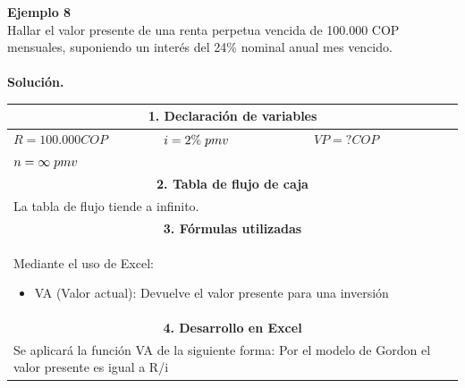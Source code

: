 \textbf{Ejemplo 8}\\
Hallar el valor presente de una renta perpetua vencida de 100.000 COP mensuales, suponiendo un interés
del 24\% nominal anual mes vencido.\\ \\
\textbf{Solución.}
\begin{center}
 \renewcommand{\arraystretch}{1.5}%
 \begin{longtable}[H]{|p{0.333\linewidth}|p{0.3333\linewidth}|p{0.3333\linewidth}|}
  \hline
  \multicolumn{3}{|c|}{\cellcolor[HTML]{FFB183}\textbf{1. Declaración de variables}}          \\ \hline
  $R= 100.000 COP $          & $i=2\% \hspace{1mm} pmv$ & $VP = ? COP$                       \\
  $n=\infty \hspace{1mm} pmv$ &                            &                                  \\ \hline
  \multicolumn{3}{|c|}{\cellcolor[HTML]{FFB183}\textbf{2. Tabla de flujo de caja}}            \\ \hline
  \multicolumn{3}{|p{\columnwidth}|}{
  La tabla de flujo tiende a infinito.
  }                                                                                           \\ \hline
  \multicolumn{3}{|c|}{\cellcolor[HTML]{FFB183}\textbf{3. Fórmulas utilizadas}}               \\ \hline
  \multicolumn{3}{|p{\columnwidth}|}{Mediante el uso de Excel:
  \begin{itemize}
   \item VA (Valor actual): Devuelve el valor presente para una inversión
  \end{itemize}
  }                                                                                           \\ \hline
  \multicolumn{3}{|c|}{\cellcolor[HTML]{FFB183}\textbf{4. Desarrollo en Excel}}               \\ \hline
  \multicolumn{3}{|p{\columnwidth}|}{
  Se aplicará la función VA de la siguiente forma: 
  Por el modelo de Gordon el valor presente es igual a R/i
  }                                                                                           \\

\end{longtable}
\end{center}
